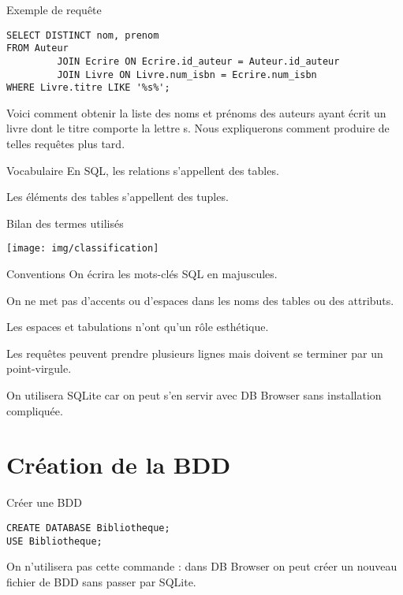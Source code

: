 \documentclass[10pt]{beamer}
\begin{document}
\begin{frame}[fragile]{Exemple de requête}

\footnotesize

\begin{verbatim}
SELECT DISTINCT nom, prenom
FROM Auteur
         JOIN Ecrire ON Ecrire.id_auteur = Auteur.id_auteur
         JOIN Livre ON Livre.num_isbn = Ecrire.num_isbn
WHERE Livre.titre LIKE '%s%';
\end{verbatim}

\normalsize\pause
Voici comment obtenir la liste des noms et prénoms des auteurs ayant écrit un livre dont le titre comporte la lettre \og s\fg{}. Nous expliquerons comment produire de telles requêtes plus tard.
\end{frame}
\begin{frame}{Vocabulaire}
	En SQL, les relations s'appellent des \alert{tables}.\\\pause

	Les éléments des tables s'appellent des \alert{tuples}.
\end{frame}
\begin{frame}{Bilan des termes utilisés}
\begin{center}
\texttt{[image: img/classification]}
\end{center}
\end{frame}
\begin{frame}{Conventions}
	On écrira les mots-clés SQL en majuscules.\\\pause

	On ne met pas d'accents ou d'espaces dans les noms des tables ou des attributs.\\\pause

    Les espaces et tabulations n'ont qu'un rôle esthétique.\\\pause

	Les requêtes peuvent prendre plusieurs lignes mais doivent se terminer par un point-virgule.\\\pause

	On utilisera SQLite car on peut s'en servir avec DB Browser sans installation compliquée.
\end{frame}
\section{Création de la BDD}
\begin{frame}[fragile]{Créer une BDD}

\begin{verbatim}
CREATE DATABASE Bibliotheque;
USE Bibliotheque;
\end{verbatim}
\pause
On n'utilisera pas cette commande : dans DB	Browser on peut créer un nouveau fichier de BDD sans passer par SQLite.
\end{frame}
\end{document}
